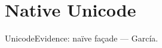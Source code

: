 \documentclass{article}
\begin{document}
\section{Native Unicode}\label{sec:unicode}
UnicodeEvidence: naïve façade — García.
\end{document}
